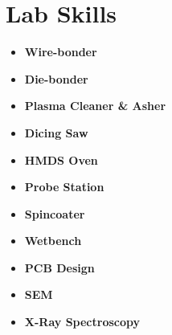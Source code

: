 \documentclass[]{chandan-cv}
\begin{document}
\begin{minipage}[t]{0.21\textwidth}

\section{Lab Skills}
	\begin{itemize}
		\setlength\itemsep{-0.2em}
		\item \textbf{Wire-bonder}
		\item \textbf{Die-bonder}
		\item \textbf{Plasma Cleaner \& Asher}
		\item \textbf{Dicing Saw}
		\item \textbf{HMDS Oven}
		\item \textbf{Probe Station}
		\item \textbf{Spincoater}
		\item \textbf{Wetbench}
		\item \textbf{PCB Design}
		\item \textbf{SEM}
		\item \textbf{X-Ray Spectroscopy}
	\end{itemize}

\sectionsep


%
%

\end{minipage}
\hfill
\end{document}
